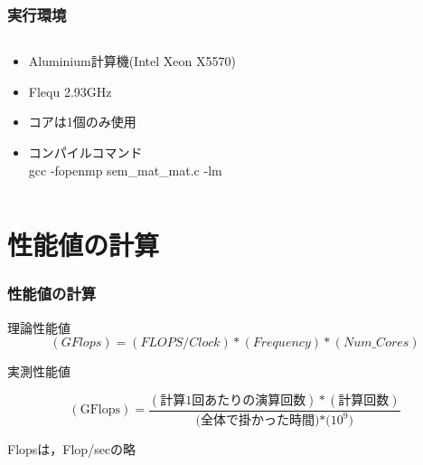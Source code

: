 \documentclass[dvipdfmx]{beamer}
\begin{document}
\begin{frame}
	\frametitle{実行環境}
	\begin{columns}
	\begin{column}{0.48\textwidth}
	\begin{itemize}
		\item Aluminium計算機(Intel Xeon X5570)\\
		\item Flequ 2.93GHz\\ \bottomrule
		\item コアは1個のみ使用
		\item コンパイルコマンド\\ gcc -fopenmp sem\_mat\_mat.c -lm
	\end{itemize}
	\end{column}

	\begin{column}{0.48\textwidth}
	\end{column}
	\end{columns}


%
\end{frame}

\section{性能値の計算}
\begin{frame}
  \frametitle{性能値の計算}
	\begin{block}{理論性能値}
	\begin{equation*}
		(GFlops) = (FLOPS/Clock) * (Frequency) * (Num\_Cores)
  \end{equation*}
	\end{block}

	\begin{block}{実測性能値}
	\begin{center}
  \begin{equation*}
		(\mbox{GFlops}) = \frac{(\mbox{計算1回あたりの演算回数})*(\mbox{計算回数})}{(\mbox{全体で掛かった時間)*($10^9$)}}
  \end{equation*}
	\end{center}
	\end{block}
	Flopsは，Flop/secの略
\end{frame}
\end{document}
